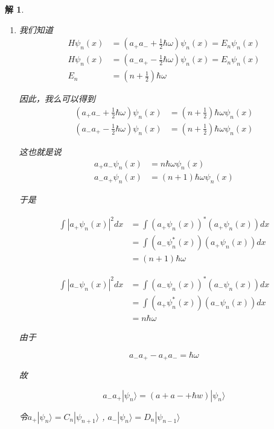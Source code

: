 \documentclass{article}
\newtheorem{solution}{解}
\begin{document}
\begin{solution}
    \begin{enumerate}
        \item[(a)] 我们知道
        \begin{align*}
            H\psi_n(x)&=\left(a_+a_-+\frac{1}{2}\hbar\omega\right)\psi_n(x)=E_n\psi_n(x)\\
            H\psi_n(x)&=\left(a_-a_+-\frac{1}{2}\hbar\omega\right)\psi_n(x)=E_n\psi_n(x)\\
            E_n&=\left(n+\frac{1}{2}\right)\hbar\omega
        \end{align*}

        因此，我么可以得到
        \begin{align*}
            \left(a_+a_-+\frac{1}{2}\hbar\omega\right)\psi_n(x)&=\left(n+\frac{1}{2}\right)\hbar\omega\psi_n(x)\\
           \left(a_-a_+-\frac{1}{2}\hbar\omega\right)\psi_n(x)&=\left(n+\frac{1}{2}\right)\hbar\omega\psi_n(x)
        \end{align*}

        这也就是说
        \begin{align*}
            a_+a_-\psi_n(x)&=n\hbar\omega\psi_n(x)\\
            a_-a_+\psi_n(x)&=\left(n+1\right)\hbar\omega\psi_n(x)
        \end{align*}

        于是

$$\begin{aligned}
\int|a_{+}\psi_{n}(x)|^{2}dx& =\int(a_{+}\psi_{n}(x))^{*}(a_{+}\psi_{n}(x))dx  \\
&=\int(a_{-}\psi_{n}^{*}(x))(a_{+}\psi_{n}(x))dx \\
&=(n+1)\hbar\omega 
\end{aligned}$$

$$\begin{aligned}
\int|a_{-}\psi_{n}(x)|^{2}dx& =\int(a_{-}\psi_{n}(x))^{*}(a_{-}\psi_{n}(x))dx  \\
&=\int(a_{+}\psi_{n}^{*}(x))(a_{-}\psi_{n}(x))dx \\
&=n\hbar\omega 
\end{aligned}$$

由于

$$a_-a_+-a_+a_-=\hbar\omega $$

故

$$a_-a_+|\psi_n\rangle=(a+a-+\hbar w)|\psi_n\rangle $$

令$a_{+ }| \psi _{n}\rangle = C_{n}| \psi _{n+ 1}\rangle$ , $a_{- }| \psi _{n}\rangle = D_{n}| \psi _{n- 1}\rangle$


\end{enumerate}
\end{solution}
\end{document}

